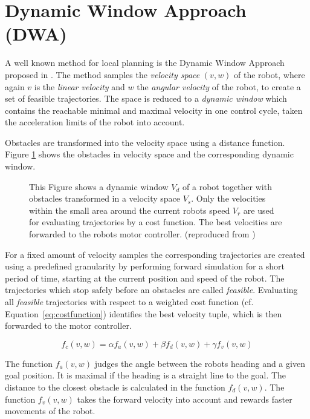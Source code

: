 \section{Dynamic Window Approach (DWA)}\label{sec:dwa}
A well known method for local planning is the Dynamic Window Approach proposed in \cite{DWA1997}. 
The method samples the \emph{velocity space} $(v,w)$ of the robot, where again $v$ is the \emph{linear velocity} and $w$ the \emph{angular velocity} of the robot, to create a set of feasible trajectories.
The space is reduced to a \emph{dynamic window} which contains the reachable minimal and maximal velocity in one control cycle, taken the acceleration limits of the robot into account.

Obstacles are transformed into the velocity space using a distance function.
Figure \ref{fig:fig_dynamic} shows the obstacles in velocity space and the corresponding dynamic window. 
\begin{figure}[thpb]
	  \myfloatalign
      \scriptsize
      \centering
    \subfloat
    {  
       \def\svgwidth{\textwidth}
       
    } 
   \caption[Dynamic Window]{This Figure shows a dynamic window $V_d$ of a robot together with obstacles transformed in a velocity space $V_s$. Only the velocities within the small area around the current robots speed $V_r$ are used for evaluating trajectories by a cost function. The best velocities are forwarded to the robots motor controller. (reproduced from \cite{DWA1997})}
   \label{fig:fig_dynamic}
\end{figure}


For a fixed amount of velocity samples the corresponding trajectories are created using a predefined granularity by performing forward simulation for a short period of time, starting at the current position and speed of the robot. 
The trajectories which stop safely before an obstacles are called \emph{feasible}.
Evaluating all \emph{feasible} trajectories with respect to a weighted cost function (cf. Equation~\ref{eq:costfunction}) identifies the best velocity tuple, which is then forwarded to the motor controller.

\begin{equation}
   f_c(v,w)=\alpha f_a(v,w)+\beta f_d(v,w)+\gamma f_v(v,w)
   \label{eq:costfunction}
\end{equation}

The function $f_a(v,w)$ judges the angle between the robots heading and a given goal position.
It is maximal if the heading is a straight line to the goal.
The distance to the closest obstacle is calculated in the function $f_d(v,w)$.
The function $f_v(v,w)$ takes the forward velocity into account and rewards faster movements of the robot.

